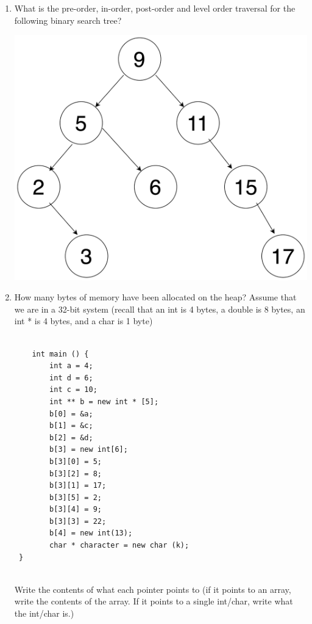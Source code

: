 \documentclass{article}
\begin{document}
\begin{enumerate}[label=(\alph*), itemsep = 120pt]
\item \textbf{}
What is the pre-order, in-order, post-order and level order traversal for the following binary search tree?

\includegraphics[scale = 0.125]{figures/bst2.png}


\item \textbf{}
How many bytes of memory have been allocated on the heap? Assume that we are in a 32-bit system (recall that an int is 4 bytes, a double is 8 bytes, an int * is 4 bytes, and a char is 1 byte)

    \begin{lstlisting}[style=CStyle]

    int main () {
        int a = 4;
        int d = 6;
        int c = 10; 
        int ** b = new int * [5];  
        b[0] = &a;
        b[1] = &c;   
        b[2] = &d;
        b[3] = new int[6];
        b[3][0] = 5;
        b[3][2] = 8;
        b[3][1] = 17;
        b[3][5] = 2;
        b[3][4] = 9;
        b[3][3] = 22; 
        b[4] = new int(13);
        char * character = new char (k);
 }


    \end{lstlisting}

    Write the contents of what each pointer points to (if it points to an array, write the contents of the array. If it points to a single int/char, write what the int/char is.) \newline \newline \newline \newline \newline 



\end{enumerate}
\end{document}
